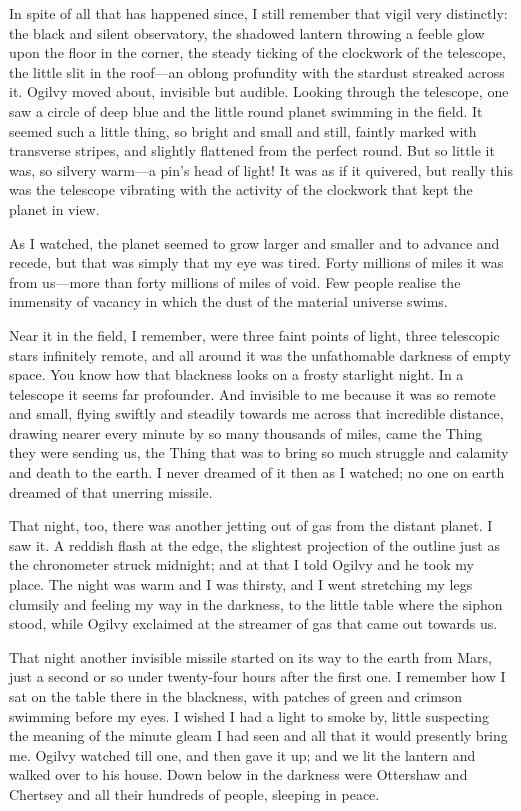 In spite of all that has happened since, I still remember that vigil very distinctly: the black and silent observatory, the shadowed lantern throwing a feeble glow upon the floor in the corner, the steady ticking of the clockwork of the telescope, the little slit in the roof—an oblong profundity with the stardust streaked across it. Ogilvy moved about, invisible but audible. Looking through the telescope, one saw a circle of deep blue and the little round planet swimming in the field. It seemed such a little thing, so bright and small and still, faintly marked with transverse stripes, and slightly flattened from the perfect round. But so little it was, so silvery warm—a pin's head of light! It was as if it quivered, but really this was the telescope vibrating with the activity of the clockwork that kept the planet in view.

As I watched, the planet seemed to grow larger and smaller and to advance and recede, but that was simply that my eye was tired. Forty millions of miles it was from us—more than forty millions of miles of void. Few people realise the immensity of vacancy in which the dust of the material universe swims.

Near it in the field, I remember, were three faint points of light, three telescopic stars infinitely remote, and all around it was the unfathomable darkness of empty space. You know how that blackness looks on a frosty starlight night. In a telescope it seems far profounder. And invisible to me because it was so remote and small, flying swiftly and steadily towards me across that incredible distance, drawing nearer every minute by so many thousands of miles, came the Thing they were sending us, the Thing that was to bring so much struggle and calamity and death to the earth. I never dreamed of it then as I watched; no one on earth dreamed of that unerring missile.

That night, too, there was another jetting out of gas from the distant planet. I saw it. A reddish flash at the edge, the slightest projection of the outline just as the chronometer struck midnight; and at that I told Ogilvy and he took my place. The night was warm and I was thirsty, and I went stretching my legs clumsily and feeling my way in the darkness, to the little table where the siphon stood, while Ogilvy exclaimed at the streamer of gas that came out towards us.

That night another invisible missile started on its way to the earth from Mars, just a second or so under twenty-four hours after the first one. I remember how I sat on the table there in the blackness, with patches of green and crimson swimming before my eyes. I wished I had a light to smoke by, little suspecting the meaning of the minute gleam I had seen and all that it would presently bring me. Ogilvy watched till one, and then gave it up; and we lit the lantern and walked over to his house. Down below in the darkness were Ottershaw and Chertsey and all their hundreds of people, sleeping in peace.

